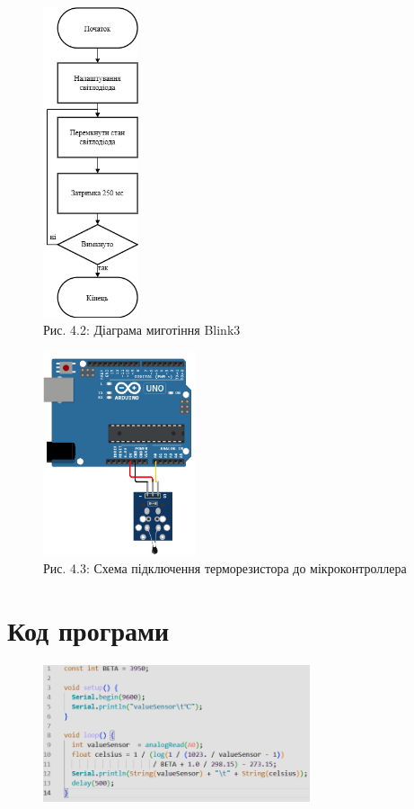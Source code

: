 \documentclass[a4paper]{article}
\begin{document}
\begin{figure}[h]
    \centering
    \includegraphics[width=0.25\textwidth]{imgs/LW4.0.2.drawio.png}
    \caption*{Рис. 4.2: Діаграма миготіння Blink3}
\end{figure} 

\newpage 


\begin{figure}[h]
    \centering
    \includegraphics[width=0.4\textwidth]{imgs/LW4_4.png}
    \caption*{Рис. 4.3: Схема підключення терморезистора до мікроконтроллера}
\end{figure} 

\section*{Код програми}
\begin{figure}[h]
  \centering
  \includegraphics[width=0.7\textwidth]{imgs/LW4_3.png}
\end{figure} 
\end{document}
